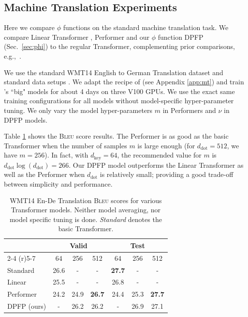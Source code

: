 \documentclass{article}
\theoremstyle{definition}
\begin{document}
\subsection{Machine Translation Experiments}
\label{sec:translation}
Here we compare $\phi$ functions on the standard machine translation task.
We compare Linear Transformer \citep{katharopoulos2020transformers},
Performer \citep{choromanski2020rethinking} and our $\phi$ function DPFP (Sec.~\ref{sec:phi})
to the regular Transformer,  complementing prior comparisons, e.g.,~\citet{tay2020long}.

We use the standard WMT14 English to German Translation dataset and
standard data setups \cite{ott2018, trafo}.
We adapt the recipe of \citet{OttEBFGNGA19} (see Appendix \ref{app:mt})
and train \citet{trafo}'s ``big" models for about 4 days on three V100 GPUs.
We use the exact same training configurations for all
models without model-specific hyper-parameter tuning.
We only vary the model hyper-parameters $m$ in Performers and $\nu$ in DPFP models.

Table \ref{tab:translation} shows the \textsc{Bleu} score \citep{papineni2002bleu, post2018} results.
The Performer is as good as the basic Transformer when the number of samples $m$ is large enough (for $d_\text{dot}=512$, we have $m=256$).
In fact, with $d_\text{key}=64$, the recommended value for $m$ is $d_\text{dot}\log(d_\text{dot})=266$.
Our DPFP model outperforms the Linear Transformer
as well as the Performer when $d_\text{dot}$ is relatively small;
providing a good trade-off between simplicity and performance.

\begin{table}[h]
\caption{WMT14 En-De Translation \textsc{Bleu} scores
for various Transformer models.
Neither model averaging, nor model specific tuning is done.
\textit{Standard} denotes the basic Transformer.}
\label{tab:translation}
\vskip 0.15in
\begin{center}
\begin{small}
\begin{tabular}{lcccccc}
\toprule
       & \multicolumn{3}{c}{Valid}  & \multicolumn{3}{c}{Test} \\  \cmidrule(r){2-4}  \cmidrule(r){5-7}
\multicolumn{1}{c}{$d_{\text{dot}}$} & 64 & 256 & 512 & 64 & 256 & 512 \\
\midrule
Standard   & 26.6 & -     & -    & \textbf{27.7}  & - & - \\
Linear    & 25.5 & -     & -    & 26.8  & - & -\\
Performer & 24.2 & 24.9  & \textbf{26.7} & 24.4  & 25.3 & \textbf{27.7} \\
DPFP (ours)   &  -   & 26.2      &  26.2  &  - & 26.9  & 27.1 \\
\bottomrule
\end{tabular}
\end{small}
\end{center}
\vskip -0.1in

\end{table}
\end{document}

